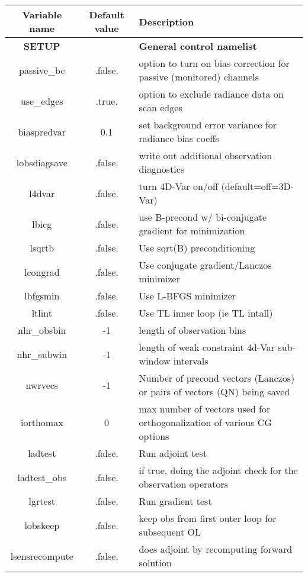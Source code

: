 \begin{table}[h]
 \footnotesize
 \center
 \begin{tabular}{| c | c | p{9cm} |}
 \hline
 Variable name & Default value & Description \\
 \hline
 \textbf{SETUP} &   & \textbf{General control namelist}\\
 \hline
   passive\_bc & .false. & option to turn on bias correction for passive (monitored) channels \\
  \hline
  use\_edges & .true. & option to exclude radiance data on scan edges \\
  \hline
  biaspredvar & 0.1 & set background error variance for radiance bias coeffs \\
  \hline
  lobsdiagsave & .false. & write out additional observation diagnostics \\
  \hline
   l4dvar & .false. & turn 4D-Var on/off (default=off=3D-Var) \\
  \hline
  lbicg & .false. & use B-precond w/ bi-conjugate gradient for minimization \\
  \hline
  lsqrtb & .false. & Use sqrt(B) preconditioning \\
  \hline
  lcongrad & .false. & Use conjugate gradient/Lanczos minimizer \\
  \hline
  lbfgsmin & .false. & Use L-BFGS minimizer \\
  \hline
  ltlint & .false. & Use TL inner loop (ie TL intall) \\
  \hline
  nhr\_obsbin & -1 & length of observation bins \\
  \hline
  nhr\_subwin & -1 & length of weak constraint 4d-Var sub-window intervals \\
  \hline
  nwrvecs & -1 & Number of precond vectors (Lanczos) or pairs of vectors (QN) being saved \\
  \hline
  iorthomax & 0 & max number of vectors used for orthogonalization of various CG options \\
  \hline
   ladtest & .false. & Run adjoint test \\
  \hline
  ladtest\_obs & .false. & if true, doing the adjoint check for the observation operators \\
  \hline
  lgrtest & .false. & Run gradient test \\
  \hline
  lobskeep & .false. & keep obs from first outer loop for subsequent OL \\
  \hline
  lsensrecompute & .false. & does adjoint by recomputing forward solution \\

\end{tabular}
\end{table}
